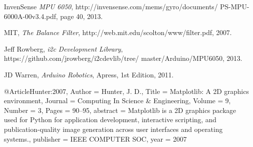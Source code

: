 \documentclass{IEEEtran}
\begin{document}
\begin{thebibliography}{9}


    InvenSense
    \emph{MPU 6050},
    http://invensense.com/mems/gyro/documents/ PS-MPU-6000A-00v3.4.pdf,
        page 40,
    2013.


         MIT,
    \emph{The Balance Filter},
    http://web.mit.edu/scolton/www/filter.pdf,
    2007.

Jeff Rowberg,
\emph{i2c Development Library},
    https://github.com/jrowberg/i2cdevlib/tree/ master/Arduino/MPU6050,
    2013.

    JD Warren,
    \emph{Arduino Robotics},
    Apress,
    1st Edition,
    2011.
 
@Article{Hunter:2007,
  Author    = {Hunter, J. D.},
  Title     = {Matplotlib: A 2D graphics environment},
  Journal   = {Computing In Science \& Engineering},
  Volume    = {9},
  Number    = {3},
  Pages     = {90--95},
  abstract  = {Matplotlib is a 2D graphics package used for Python
  for application development, interactive scripting, and
  publication-quality image generation across user
  interfaces and operating systems.},
  publisher = {IEEE COMPUTER SOC},
  year      = 2007
}

\end{thebibliography}
\end{document}
